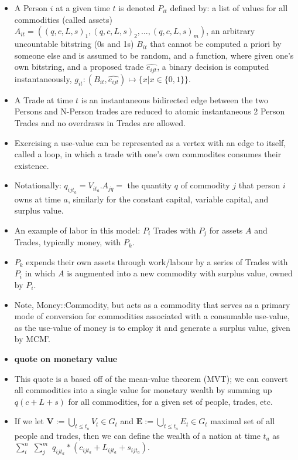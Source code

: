 \documentclass[12pt]{article}
\begin{document}
\begin{itemize}
    \item A Person $i$ at a given time $t$ is denoted $P_{it}$ defined by: a list of values for all commodities (called assets) $A_{it} = ((q, c, L, s)_{1}, (q, c, L, s)_{2},...,(q, c, L, s)_{m})$, an arbitrary uncountable bitstring (0s and 1s) $B_{it}$ that cannot be computed a priori by someone else and is assumed to be random, and a function, where given one's own bitstring, and a proposed trade $\hat{e_{ijt}}$, a binary decision is computed instantaneously, $g_{it} : (B_{it}, \hat{e_{ijt}}) \mapsto \{x | x \in  \{0, 1\}\}$.
    \item A Trade at time $t$ is an instantaneous bidirected edge between the two Persons and N-Person trades are reduced to atomic instantaneous 2 Person Trades and no overdraws in Trades are allowed. 
    \item Exercising a use-value can be represented as a vertex with an edge to itself, called a loop, in which a trade with one's own commodites consumes their existence.
    \item Notationally: $q_{ijt_{a}} = V_{it_{a}}.A_{jq} =$ the quantity $q$ of commodity $j$ that person $i$ owns at time $a$, similarly for the constant capital, variable capital, and surplus value.
    \item An example of labor in this model: $P_i$ Trades with $P_j$ for assets $A$ and Trades, typically money, with $P_k$.
    \item $P_k$ expends their own assets through work/labour by a series of Trades with $P_i$ in which $A$ is augmented into a new commodity with surplus value, owned by $P_i$.  
    \item Note, Money::Commodity, but acts as a commodity that serves as a primary mode of conversion for commodities associated with a consumable use-value, as the use-value of money is to employ it and generate a surplus value, given by MCM'.
    \item \textbf{quote on monetary value}
    \item This quote is a based off of the mean-value theorem (MVT); we can convert all commodities into a single value for monetary wealth by summing up $q(c+L+s)$ for all commodities, for a given set of people, trades, etc.
    \item If we let $\boldsymbol{V} :=\bigcup\limits_{t \leq t_a} V_t \in G_t$ and $\boldsymbol{E} :=\bigcup\limits_{t \leq t_a} E_t \in G_t$ maximal set of all people and trades, then we can define the wealth of a nation at time $t_a$ as $\sum\limits_i^n$ $\sum\limits_j^m$ $q_{ijt_{a}} * (c_{ijt_{a}} + L_{ijt_{a}} + s_{ijt_{a}})$. 

\end{itemize}
\end{document}
